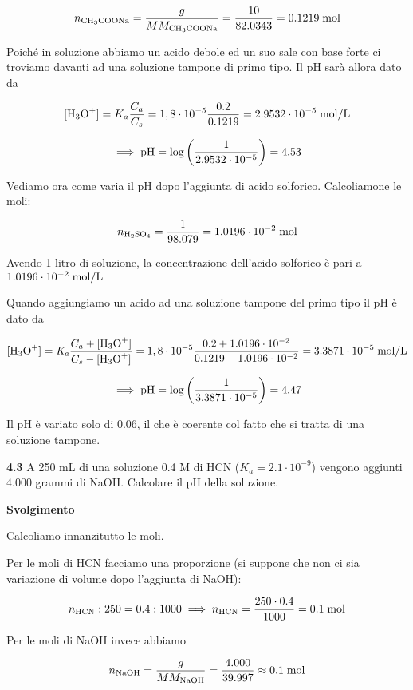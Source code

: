 $$n_{\rm CH_3COONa}
=\frac{g}{MM_{\rm CH_3COONa}}
=\frac{10}{82.0343}
=0.1219 \; \rm mol$$

Poiché in soluzione abbiamo un acido debole ed un suo sale con base forte ci troviamo davanti ad una soluzione tampone di primo tipo. Il pH sarà allora dato da

$$[\text{H}_3\text{O}^+]
=K_a \frac{C_a}{C_s}
=1,8 \cdot 10^{-5} \frac{0.2}{0.1219}
=2.9532 \cdot 10^{-5} \; \rm mol/L$$

$$\implies \rm pH
=\log{\left( \frac{1}{2.9532 \cdot 10^{-5}} \right)}
=4.53$$

Vediamo ora come varia il pH dopo l'aggiunta di acido solforico. Calcoliamone le moli:

$$n_{\rm H_2SO_4}
=\frac{1}{98.079}
=1.0196 \cdot 10^{-2} \; \rm mol$$

Avendo 1 litro di soluzione, la concentrazione dell'acido solforico è pari a $1.0196 \cdot 10^{-2} \; \rm mol/L$

Quando aggiungiamo un acido ad una soluzione tampone del primo tipo il pH è dato da

$${[\text{H}_3\text{O}^+]}=\textit{K}_\textit{a} \frac{C_a + \rm{[\text{H}_3\text{O}^+]}}{C_s - \rm{[\text{H}_3\text{O}^+]}}
=1,8 \cdot 10^{-5} \frac{0.2 + 1.0196 \cdot 10^{-2}}{0.1219 - 1.0196 \cdot 10^{-2}}
=3.3871 \cdot 10^{-5} \; \rm mol/L$$

$$\implies \rm pH=\log{\left( \frac{1}{3.3871 \cdot 10^{-5}} \right)}=4.47$$

Il pH è variato solo di 0.06, il che è coerente col fatto che si tratta di una soluzione tampone.

\vspace{0.2cm}\textbf{4.3} A 250 mL di una soluzione 0.4 M di HCN ($K_a = 2.1 \cdot 10^{-9}$) vengono aggiunti 4.000 grammi di NaOH. Calcolare il pH della soluzione.

\vspace{0.2cm}\large\textbf{Svolgimento}\normalsize

\vspace{0.2cm}Calcoliamo innanzitutto le moli.

Per le moli di HCN facciamo una proporzione (si suppone che non ci sia variazione di volume dopo l'aggiunta di NaOH):

$$n_{\rm HCN}:250=0.4:1000
\implies
n_{\rm HCN}=\frac{250 \cdot 0.4}{1000}=0.1 \; \rm mol$$

Per le moli di NaOH invece abbiamo

$$n_{\rm NaOH}=\frac{g}{MM_{\rm NaOH}}
=\frac{4.000}{39.997} \approx 0.1 \; \rm mol$$

